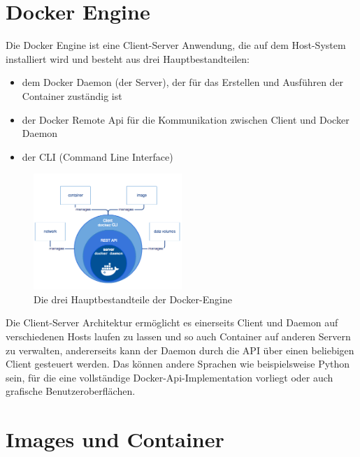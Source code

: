 
\section{Docker Engine}

Die Docker Engine ist eine Client-Server Anwendung, die auf dem Host-System installiert wird und besteht aus drei Hauptbestandteilen:\\

\begin{itemize}
  \item dem Docker Daemon (der Server), der für das Erstellen und Ausführen der Container zuständig ist
  \item der Docker Remote Api für die Kommunikation zwischen Client und Docker Daemon
  \item der CLI (Command Line Interface)
\end{itemize}

\begin{figure}[!ht]
  \centering
  \includegraphics[width=0.5\textwidth]{images/docker-engine.png}
  \caption{Die drei Hauptbestandteile der Docker-Engine \cite{docker:ud}}
\end{figure}

Die Client-Server Architektur ermöglicht es einerseits Client und Daemon auf verschiedenen Hosts laufen zu lassen und so auch Container auf anderen Servern zu verwalten, andererseits kann der Daemon durch die API über einen beliebigen Client gesteuert werden. Das können andere Sprachen wie beispielsweise Python sein, für die eine vollständige Docker-Api-Implementation vorliegt oder auch grafische Benutzeroberflächen.


\section{Images und Container}

